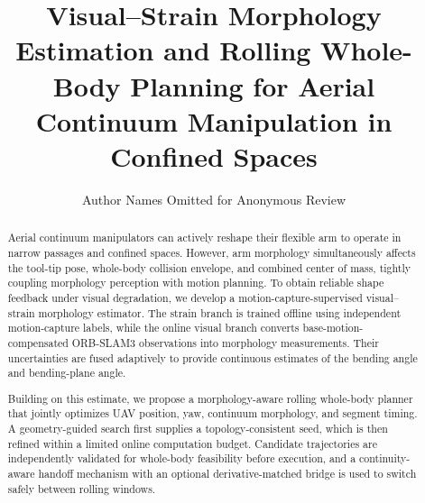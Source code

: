 \documentclass[journal,twoside]{IEEEtran}
\begin{document}
\title{Visual--Strain Morphology Estimation and Rolling Whole-Body Planning for Aerial Continuum Manipulation in Confined Spaces}
\author{Author Names Omitted for Anonymous Review}
\maketitle


\begin{abstract}
Aerial continuum manipulators can actively reshape their flexible arm to operate in narrow passages and confined spaces. However, arm morphology simultaneously affects the tool-tip pose, whole-body collision envelope, and combined center of mass, tightly coupling morphology perception with motion planning. To obtain reliable shape feedback under visual degradation, we develop a motion-capture-supervised visual--strain morphology estimator. The strain branch is trained offline using independent motion-capture labels, while the online visual branch converts base-motion-compensated ORB-SLAM3 observations into morphology measurements. Their uncertainties are fused adaptively to provide continuous estimates of the bending angle and bending-plane angle.

Building on this estimate, we propose a morphology-aware rolling whole-body planner that jointly optimizes UAV position, yaw, continuum morphology, and segment timing. A geometry-guided search first supplies a topology-consistent seed, which is then refined within a limited online computation budget. Candidate trajectories are independently validated for whole-body feasibility before execution, and a continuity-aware handoff mechanism with an optional derivative-matched bridge is used to switch safely between rolling windows.


\end{abstract}
\end{document}

